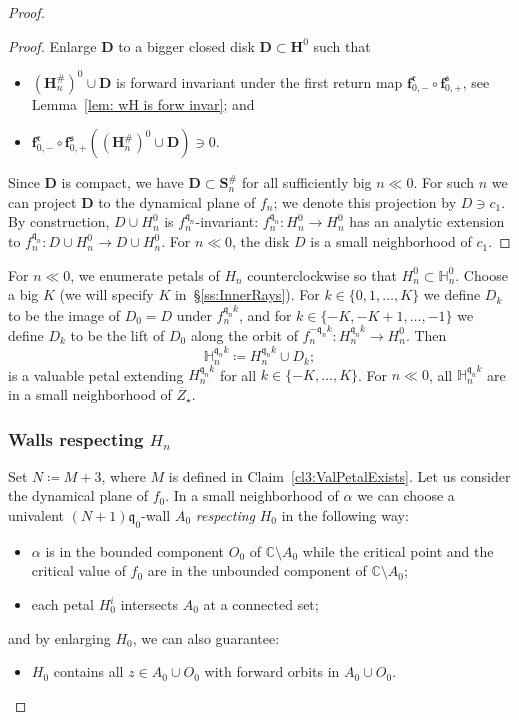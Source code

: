 \documentclass[]{amsart}
\newcommand{\bD}{{\mathbf D}}
\newcommand{\bS}{{\mathbf S}}
\newcommand{\bH}{{\mathbf H}}
\newcommand{\fH}{{\mathbb H}}
\newcommand{\bbf}{{\mathbf f}}
\newcommand{\str}{{\star}}
\renewcommand{\qq}{\mathfrak{q}}
\newcommand{\rr}{\mathfrak{r}}
\renewcommand{\ss}{\mathfrak{s}}
\newcommand{\C}{\mathbb{C}}
\theoremstyle{remark}
\numberwithin{equation}{section}
\theoremstyle{definition}
\begin{document}
\begin{proof}
\begin{proof}
Enlarge $\bD$ to a bigger closed disk $\bD\subset \bH^0$ such that
\begin{itemize}
 \item $(\bH_n^\#)^0\cup \bD$ is forward invariant under the first return map $\bbf_{0,-}^\rr\circ\bbf_{0,+}^\ss$, see Lemma~\ref{lem: wH is forw invar}; and
\item $\bbf_{0,-}^\rr\circ\bbf_{0,+}^\ss\left((\bH_n^\#)^0\cup \bD\right)\ni 0$.
\end{itemize}

Since $\bD$ is compact, we have $\bD\subset \bS_n^{\#}$ for all sufficiently big $n\ll 0$. For such $n$ we can project $\bD$ to the dynamical plane of $f_n$; we denote this projection by $D\ni c_1$. By construction, $D\cup H_{n}^0$ is $f^{\qq_n}_n$-invariant: $f_n^{\qq_n}\colon H_{n}^0 \to H_{n}^0 $ has an analytic extension to $f_n^{\qq_n}\colon D\cup H_{n}^0\to D\cup H_{n}^0$. For $n\ll 0$, the disk $D$ is a small neighborhood of $c_1$.  
\end{proof}


For $n\ll0$, we enumerate petals of $H_n$ counterclockwise so that $H_n^0\subset \fH_n^0$. Choose a big $K$ (we will specify $K$ in~\S\ref{ss:InnerRays}). For $k\in \{0,1,\dots, K\}$ we define $D_k$ to be the image of $D_0=D$ under $f_n^{\qq_n k}$, and for $k\in\{-K,-K+1,\dots, -1\}$ we define $D_k$ to be the lift of $D_0$ along the orbit of $f_n^{-\qq_nk}\colon H_n^{\qq_n k}\to H_n^{0}$. Then
\begin{equation}
\label{eq:defn:val pet}
\fH^{\qq_n k}_n\coloneqq H_n^{\qq_n k}\cup D_k;
\end{equation}
 is a valuable petal extending $H_n^{\qq_n k}$ for all $k\in \{-K,\dots, K\}$. For $n\ll0$, all $\fH_n^{\qq_n k}$  are in a small neighborhood of $\overline Z_\str$.


\subsubsection{Walls respecting $H_n$} 
\label{sss:N Walls}
Set $N\coloneqq M+3$, where $M$ is defined in Claim~\ref{cl3:ValPetalExists}. Let us consider the dynamical plane of $f_0$. In a small neighborhood of $\alpha$ we can choose a univalent $(N+1)\qq_0$-wall $A_0$ \emph{respecting} $H_0$ in the following way:
\begin{itemize}
\item[(a)] $\alpha$ is in the bounded component $O_0$ of $\C\setminus A_0$ while the critical point and the critical value of $f_0$ are in the unbounded component of $\C\setminus A_0$; 
\item[(b)]  each petal $H_{0}^{i}$ intersects $A_0$ at a connected set;
\end{itemize}
and by enlarging $H_0$, we can also guarantee: 
\begin{itemize}
\item[(c)] $H_0$ contains all $z\in A_0\cup O_0$ with forward orbits in $A_0\cup O_0$.
\end{itemize}


\end{proof}
\end{document}
